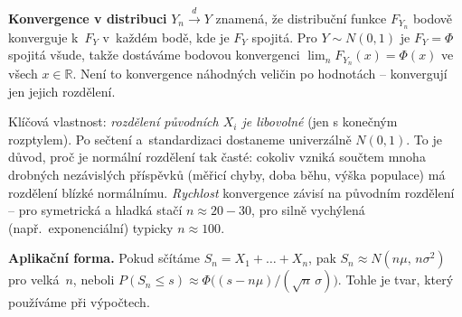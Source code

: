 \documentclass[11pt,a4paper]{article}
\newcommand{\R}{\mathbb{R}}
\begin{document}
\begin{poznamka}
\textbf{Konvergence v distribuci} $Y_n\xrightarrow{d} Y$ znamená, že distribuční funkce $F_{Y_n}$ bodově konverguje k~$F_Y$ v~každém bodě, kde je $F_Y$ spojitá. Pro $Y\sim N(0,1)$ je $F_Y=\Phi$ spojitá všude, takže dostáváme bodovou konvergenci $\lim_n F_{Y_n}(x)=\Phi(x)$ ve všech $x\in\R$. Není to konvergence náhodných veličin po hodnotách -- konvergují jen jejich rozdělení.
\end{poznamka}

\begin{intuice}
Klíčová vlastnost: \emph{rozdělení původních $X_i$ je libovolné} (jen s konečným rozptylem). Po sečtení a~standardizaci dostaneme univerzálně $N(0,1)$. To je důvod, proč je normální rozdělení tak časté: cokoliv vzniká součtem mnoha drobných nezávislých příspěvků (měřicí chyby, doba běhu, výška populace) má rozdělení blízké normálnímu. \emph{Rychlost} konvergence závisí na původním rozdělení -- pro symetrická a hladká stačí $n\approx 20{-}30$, pro silně vychýlená (např.\ exponenciální) typicky $n\approx 100$.
\end{intuice}

\begin{poznamka}
\textbf{Aplikační forma.} Pokud sčítáme $S_n=X_1+\dots+X_n$, pak $S_n\approx N(n\mu,\,n\sigma^2)$ pro velká~$n$, neboli $P(S_n\le s)\approx \Phi\bigl((s-n\mu)/(\sqrt{n}\,\sigma)\bigr)$. Tohle je tvar, který používáme při výpočtech.
\end{poznamka}
\end{document}
